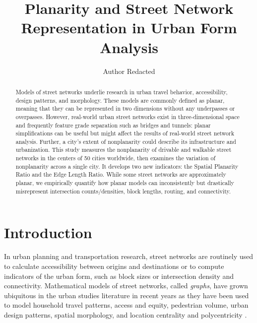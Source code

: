 \documentclass[Afour,sageh,times]{sagej}
\begin{document}
\title{Planarity and Street Network Representation in Urban Form Analysis}
\author{Author Redacted}



\begin{abstract}

Models of street networks underlie research in urban travel behavior, accessibility, design patterns, and morphology. These models are commonly defined as planar, meaning that they can be represented in two dimensions without any underpasses or overpasses. However, real-world urban street networks exist in three-dimensional space and frequently feature grade separation such as bridges and tunnels: planar simplifications can be useful but might affect the results of real-world street network analysis. Further, a city's extent of nonplanarity could describe its infrastructure and urbanization. This study measures the nonplanarity of drivable and walkable street networks in the centers of 50 cities worldwide, then examines the variation of nonplanarity across a single city. It develops two new indicators: the Spatial Planarity Ratio and the Edge Length Ratio. While some street networks are approximately planar, we empirically quantify how planar models can inconsistently but drastically misrepresent intersection counts/densities, block lengths, routing, and connectivity.

\end{abstract}


\maketitle



\section{Introduction}

In urban planning and transportation research, street networks are routinely used to calculate accessibility between origins and destinations or to compute indicators of the urban form, such as block sizes or intersection density and connectivity. Mathematical models of street networks, called \emph{graphs}, have grown ubiquitous in the urban studies literature in recent years as they have been used to model household travel patterns, access and equity, pedestrian volume, urban design patterns, spatial morphology, and location centrality and polycentricity \citep{marshall_street_2010,pflieger_switzerland_2010,porta_street_2012,lee_identifying_2014,porta_alterations_2014,marshall_community_2014,hajrasouliha_impact_2015,parthasarathi_street_2015,knight_metrics_2015,xiao_identifying_2016,zhong_revealing_2017}.
\end{document}
